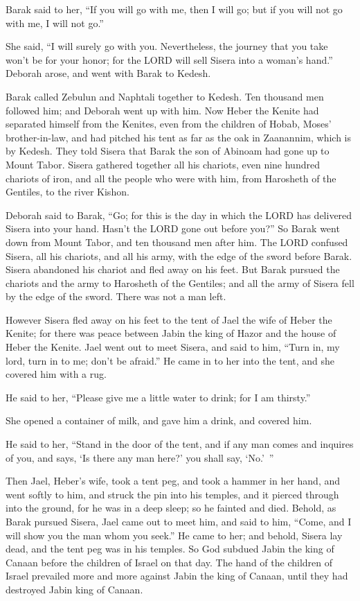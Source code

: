 \myverse{}Barak said to her, “If you will go with me, then I will go; but
if you will not go with me, I will not go.”

\myverse{}She said, “I will surely go with you. Nevertheless, the journey
that you take won’t be for your honor; for the LORD will sell Sisera into a woman’s hand.” Deborah arose,
and went with Barak to Kedesh.

\myverse{}Barak called Zebulun and Naphtali together to Kedesh. Ten thousand
men followed him; and Deborah went up with him.
\myverse{}Now Heber the Kenite had separated himself from the Kenites, even from the
children of Hobab, Moses’ brother-in-law, and had pitched his tent as far as the oak in Zaanannim, which
is by Kedesh.
\myverse{}They told Sisera that Barak the son of Abinoam had gone up to Mount Tabor.
\myverse{}Sisera gathered together all his chariots, even nine hundred chariots of iron,
and all the people who were with him, from Harosheth of the Gentiles, to the river Kishon.

\myverse{}Deborah said to Barak, “Go; for this is the day in which the
LORD has delivered Sisera into your hand. Hasn’t the LORD gone out before you?” So Barak went down from
Mount Tabor, and ten thousand men after him.
\myverse{}The LORD confused Sisera, all his chariots, and all his army, with the edge
of the sword before Barak. Sisera abandoned his chariot and fled away on his feet.
\myverse{}But Barak pursued the chariots and the army to Harosheth of the Gentiles;
and all the army of Sisera fell by the edge of the sword. There was not a man left.

\myverse{}However Sisera fled away on his feet to the tent of Jael the
wife of Heber the Kenite; for there was peace between Jabin the king of Hazor and the house of Heber the
Kenite.
\myverse{}Jael went out to meet Sisera, and said to him, “Turn in, my lord, turn in
to me; don’t be afraid.” He came in to her into the tent, and she covered him with a rug.

\myverse{}He said to her, “Please give me a little water to drink; for
I am thirsty.”

She opened a container of milk, and gave him a drink, and covered him.

\myverse{}He said to her, “Stand in the door of the tent, and if any man
comes and inquires of you, and says, ‘Is there any man here?’ you shall say, ‘No.’ ”

\myverse{}Then Jael, Heber’s wife, took a tent peg, and took a hammer in
her hand, and went softly to him, and struck the pin into his temples, and it pierced through into the
ground, for he was in a deep sleep; so he fainted and died.
\myverse{}Behold, as Barak pursued Sisera, Jael came out to meet him, and said to him,
“Come, and I will show you the man whom you seek.” He came to her; and behold, Sisera lay dead, and the
tent peg was in his temples.
\myverse{}So God subdued Jabin the king of Canaan before the children of Israel on that
day.
\myverse{}The hand of the children of Israel prevailed more and more against Jabin the
king of Canaan, until they had destroyed Jabin king of Canaan.


